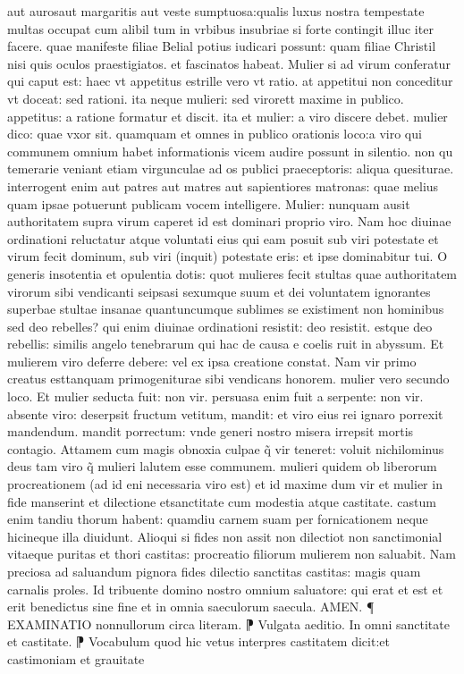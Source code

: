 \documentclass{article}
\begin{document}
\begin{pages}
aut aurosaut margaritis aut veste sumptuosa:qualis luxus nostra tempestate multas occupat cum alibil tum in vrbibus insubriae si forte contingit illuc iter facere. quae manifeste filiae Belial potius iudicari possunt: quam filiae Christil nisi quis oculos praestigiatos. et fascinatos habeat. Mulier si ad virum conferatur qui caput est: haec vt appetitus estrille vero vt ratio. at appetitui non conceditur vt doceat: sed rationi. ita neque  mulieri: sed virorett maxime in publico. appetitus: a ratione formatur et discit. ita et mulier: a viro discere debet. mulier dico: quae vxor sit. quamquam et omnes in publico orationis loco:a viro qui communem omnium habet informationis vicem audire possunt in silentio. non qu temerarie veniant etiam virgunculae ad os publici praeceptoris: aliqua quesiturae. interrogent enim aut patres aut matres aut sapientiores matronas: quae melius quam ipsae potuerunt publicam vocem intelligere. Mulier: nunquam ausit authoritatem supra virum caperet id est dominari proprio viro. Nam hoc diuinae ordinationi reluctatur  atque  voluntati eius qui eam posuit sub viri potestate et virum fecit dominum, sub viri (inquit) potestate eris: et ipse dominabitur tui. O generis insotentia et opulentia dotis: quot mulieres fecit stultas quae authoritatem virorum sibi vendicanti seipsasi sexumque  suum  et dei voluntatem ignorantes  superbae  stultae  insanae  quantuncumque  sublimes se existiment non hominibus sed deo rebelles? qui enim diuinae ordinationi resistit: deo resistit. estque  deo rebellis: similis angelo tenebrarum qui hac de causa e coelis ruit in abyssum. Et mulierem viro deferre debere: vel ex ipsa creatione constat. Nam vir primo creatus esttanquam primogeniturae sibi vendicans honorem. mulier vero secundo loco. Et mulier seducta fuit: non vir. persuasa enim fuit a serpente: non vir. absente viro: deserpsit fructum vetitum, mandit: et viro eius rei ignaro porrexit mandendum. mandit porrectum: vnde generi nostro misera irrepsit mortis contagio. Attamem cum magis obnoxia culpae q̃ vir teneret: voluit nichilominus deus tam viro q̃ mulieri lalutem esse communem. mulieri quidem ob liberorum procreationem (ad id eni necessaria viro est) et id maxime dum vir et mulier in fide manserint et dilectione etsanctitate cum modestia atque  castitate. castum enim tandiu thorum habent: quamdiu carnem suam per fornicationem neque  hicineque  illa diuidunt. Alioqui si fides non assit non dilectiot non sanctimonial vitaeque  puritas et thori castitas: procreatio filiorum mulierem non saluabit. Nam preciosa ad saluandum pignora fides dilectio  sanctitas castitas: magis quam carnalis proles. Id tribuente domino nostro omnium saluatore: qui erat  et est et erit benedictus sine fine et in omnia saeculorum saecula. AMEN.  \pend\pstart   ¶ EXAMINATIO nonnullorum circa literam. ⁋ Vulgata aeditio. In omni sanctitate et   castitate. ⁋ Vocabulum quod  hic vetus interpres castitatem dicit:et castimoniam et grauitate  \pend

\end{pages}
\end{document}
